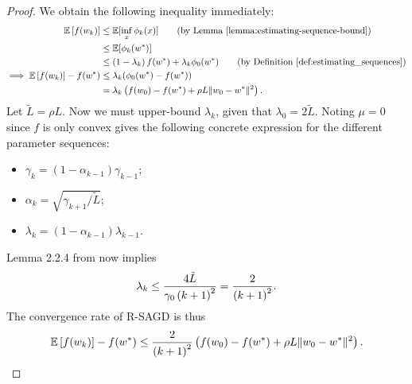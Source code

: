 \convexAGD*
\begin{proof}
    We obtain the following inequality immediately:
    \begin{align*}
        \E\sbr{f(\wk)} &\leq \E[\inf_x \phi_k(x)] \tag{by Lemma~\ref{lemma:estimating-sequence-bound}}\\
        &\leq \E[\phi_k(\wopt)] \\
        &\leq \rbr{1 - \lambda_k} f(\wopt) + \lambda_k \phi_0(\wopt) \tag{by Definition~\ref{def:estimating_sequences}}\\
        \implies \E\sbr{f(\wk)} - f(\wopt) &\leq \lambda_k (\phi_0(\wopt) - f(\wopt))\\
                                           &= \lambda_k \rbr{f(\w_0) - f(\wopt) + \rho L \norm{\w_0 - \wopt}^2 }.
    \end{align*}
    Let \( \tilde L = \rho L \). 
    Now we must upper-bound \( \lambda_k \), given that \( \lambda_0 = 2 \tilde L \).
    Noting \( \mu = 0 \) since \( f \) is only convex gives the following concrete expression for the different parameter sequences: 
    \begin{itemize}
        \item \(  \gamma_{k}  = (1 - \alpha_{k-1}) \gamma_{k-1} \);
        \item \( \alpha_{k} = \sqrt{\gamma_{k+1} / \tilde L} \);
        \item \( \lambda_{k} = (1 - \alpha_{k-1}) \lambda_{k-1} \).
    \end{itemize}
    Lemma 2.2.4 from \citet{nesterov2004lectures} now implies 
    \[ \lambda_k \leq \frac{4 \tilde L}{\gamma_0 \left(k + 1\right)^2} = \frac{2}{\left(k + 1\right)^2}. \]
    The convergence rate of R-SAGD is thus 
    \[  \mathbb{E}\left[f(w_k)\right] - f(w^*) \leq \frac{2}{\left(k+1\right)^2}\left(f(w_0) - f(w^*) + \rho L \|w_0 - w^*\|^2 \right). \]
\end{proof}
